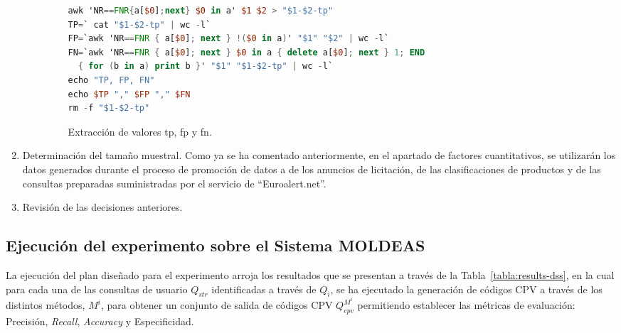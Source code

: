 \begin{enumerate}
\begin{enumerate}
\begin{figure}[!ht] 
\begin{center}
\begin{lstlisting}[language=AWK]
awk 'NR==FNR{a[$0];next} $0 in a' $1 $2 > "$1-$2-tp"
TP=` cat "$1-$2-tp" | wc -l`
FP=`awk 'NR==FNR { a[$0]; next } !($0 in a)' "$1" "$2" | wc -l`
FN=`awk 'NR==FNR { a[$0]; next } $0 in a { delete a[$0]; next } 1; END 
  { for (b in a) print b }' "$1" "$1-$2-tp" | wc -l`
echo "TP, FP, FN"
echo $TP "," $FP "," $FN
rm -f "$1-$2-tp"
\end{lstlisting}
\caption{Extracción de valores tp, fp y fn.}
\label{figure:extrac-pras}
\end{center}
\end{figure}

\end{enumerate}

 \item Determinación del tamaño muestral. Como ya se ha comentado anteriormente, en el apartado de factores cuantitativos, se utilizarán
 los datos generados durante el proceso de promoción de datos a \linkeddata de los anuncios de licitación, de las clasificaciones de productos y 
de las consultas preparadas suministradas por el servicio de ``Euroalert.net''.
 \item Revisión de las decisiones anteriores.

\end{enumerate}

\subsection{Ejecución del experimento sobre el Sistema MOLDEAS}
La ejecución del plan diseñado para el experimento arroja los resultados que se presentan 
a través de la Tabla~\ref{tabla:results-dss}, en la cual para cada una de las consultas 
de usuario $Q_{str}$ identificadas a través de $Q_{i}$, se ha ejecutado la generación 
de códigos \gls{CPV} a través de los distintos métodos, $M^i$, para obtener un conjunto 
de salida de códigos CPV $Q^{M^i}_{cpv}$ permitiendo establecer las métricas 
de evaluación: Precisión, \textit{Recall}, \textit{Accuracy} y Especificidad.


